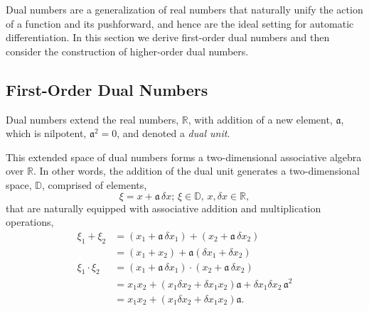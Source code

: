 Dual numbers are a generalization of real numbers that naturally unify the
action of a function and its pushforward, and hence are the ideal setting for
automatic differentiation.  In this section we derive first-order dual numbers
and then consider the construction of higher-order dual numbers.

\subsection{First-Order Dual Numbers}

Dual numbers extend the real numbers, $\mathbb{R}$, with
addition of a new element, $\mathfrak{a}$, which is nilpotent, $\mathfrak{a}^{2} = 0$,
and denoted a \textit{dual unit}.

This extended space of dual numbers forms a two-dimensional associative algebra 
over $\mathbb{R}$.  In other words, the addition of the dual unit generates a two-dimensional
space, $\mathbb{D}$, comprised of elements,
%
\begin{equation*}
\xi = x + \mathfrak{a} \, \delta x; \, \xi \in \mathbb{D}, \, x, \delta x \in \mathbb{R},
\end{equation*}
%
that are naturally equipped with associative addition and multiplication operations,
%
\begin{align*}
\xi_{1} + \xi_{2} 
&=
 \left( x_{1} + \mathfrak{a} \, \delta x_{1} \right) 
 + \left( x_{2} + \mathfrak{a} \,  \delta x_{2} \right) 
\\
&=
\left( x_{1} + x_{2} \right) 
+ \mathfrak{a} \left( \delta x_{1} + \delta x_{2} \right) 
\\
\xi_{1} \cdot \xi_{2} 
&= 
\left( x_{1} + \mathfrak{a} \, \delta x_{1} \right) 
\cdot \left( x_{2} + \mathfrak{a} \, \delta x_{2} \right) 
\\
&= 
x_{1} x_{2} + \left( x_{1} \delta x_{2} 
+ \delta x_{1} x_{2} \right) \mathfrak{a} 
+ \delta x_{1} \delta x_{2} \, \mathfrak{a}^{2} 
\\
&= 
x_{1} x_{2} + \left( x_{1} \delta x_{2} + \delta x_{1} x_{2} \right) \mathfrak{a}.
\end{align*}  

